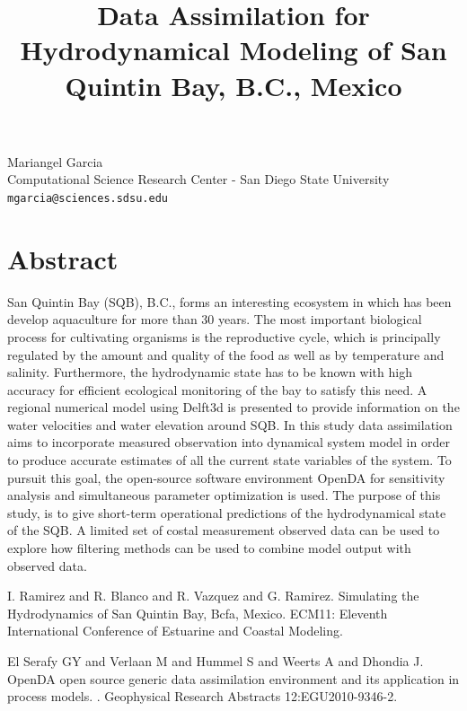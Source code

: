 \documentclass[article,A4,11pt]{llncs}%
\begin{document}
\title{Data Assimilation for Hydrodynamical Modeling of San Quintin Bay, B.C., Mexico}
 \author{} \institute{}
\maketitle
\begin{center}
{\large Mariangel Garcia}\\
Computational Science Research Center - San Diego State University\\
{\tt mgarcia@sciences.sdsu.edu}
\end{center}

\section*{Abstract}
San Quintin Bay (SQB), B.C., forms an interesting ecosystem in which has been develop aquaculture for more than 30 years. The most important biological process for cultivating organisms is the reproductive cycle, which is principally regulated by the amount and quality of the food as well as by temperature and salinity. Furthermore, the hydrodynamic state has to be known with high accuracy for efficient ecological monitoring of the bay to satisfy this need. A regional numerical model using Delft3d is presented to provide information on the water velocities and water elevation around SQB.  In this study data assimilation aims to incorporate measured observation into dynamical system model in order to produce accurate estimates of all the current state variables of the system. To pursuit this goal, the open-source software environment OpenDA for sensitivity analysis and simultaneous parameter optimization is used. The purpose of this study, is to give short-term operational predictions of the hydrodynamical state of the SQB. A limited set of costal measurement observed data can be used to explore how filtering methods can be used to combine model output with observed data.



\begin{thebibliography}{10}
{\sc I. Ramirez and R. Blanco and R. Vazquez and G. Ramirez}. {Simulating the Hydrodynamics of San Quintin Bay, Bcfa, Mexico}. ECM11: Eleventh International Conference of Estuarine and Coastal Modeling.

{\sc El Serafy GY and Verlaan M and Hummel S and Weerts A and Dhondia J}. {OpenDA open source generic data assimilation environment and its application in process models. }. Geophysical Research Abstracts 12:EGU2010-9346-2.
\end{thebibliography}
\end{document}
